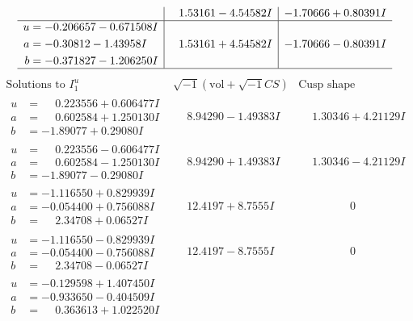\documentclass[1p]{elsarticle_modified}
\theoremstyle{definition}
\newcommand{\I}{\sqrt{-1}}
\begin{document}
$$\begin{array}{c|c|c}
 & \phantom{-}1.53161 - 4.54582 I & -1.70666 + 0.80391 I \\ \hline\begin{aligned}
u &= -0.206657 - 0.671508 I \\
a &= -0.30812 - 1.43958 I \\
b &= -0.371827 - 1.206250 I\end{aligned}
 & \phantom{-}1.53161 + 4.54582 I & -1.70666 - 0.80391 I\\
 \hline 
 \end{array}$$\newpage$$\begin{array}{c|c|c}  
\text{Solutions to }I^u_{1}& \I (\text{vol} + \sqrt{-1}CS) & \text{Cusp shape}\\
 \hline 
\begin{aligned}
u &= \phantom{-}0.223556 + 0.606477 I \\
a &= \phantom{-}0.602584 + 1.250130 I \\
b &= -1.89077 + 0.29080 I\end{aligned}
 & \phantom{-}8.94290 - 1.49383 I & \phantom{-}1.30346 + 4.21129 I \\ \hline\begin{aligned}
u &= \phantom{-}0.223556 - 0.606477 I \\
a &= \phantom{-}0.602584 - 1.250130 I \\
b &= -1.89077 - 0.29080 I\end{aligned}
 & \phantom{-}8.94290 + 1.49383 I & \phantom{-}1.30346 - 4.21129 I \\ \hline\begin{aligned}
u &= -1.116550 + 0.829939 I \\
a &= -0.054400 + 0.756088 I \\
b &= \phantom{-}2.34708 + 0.06527 I\end{aligned}
 & \phantom{-}12.4197 + 8.7555 I & \phantom{-0.000000 } 0 \\ \hline\begin{aligned}
u &= -1.116550 - 0.829939 I \\
a &= -0.054400 - 0.756088 I \\
b &= \phantom{-}2.34708 - 0.06527 I\end{aligned}
 & \phantom{-}12.4197 - 8.7555 I & \phantom{-0.000000 } 0 \\ \hline\begin{aligned}
u &= -0.129598 + 1.407450 I \\
a &= -0.933650 - 0.404509 I \\
b &= \phantom{-}0.363613 + 1.022520 I\end{aligned}

\end{array}$$
\end{document}
